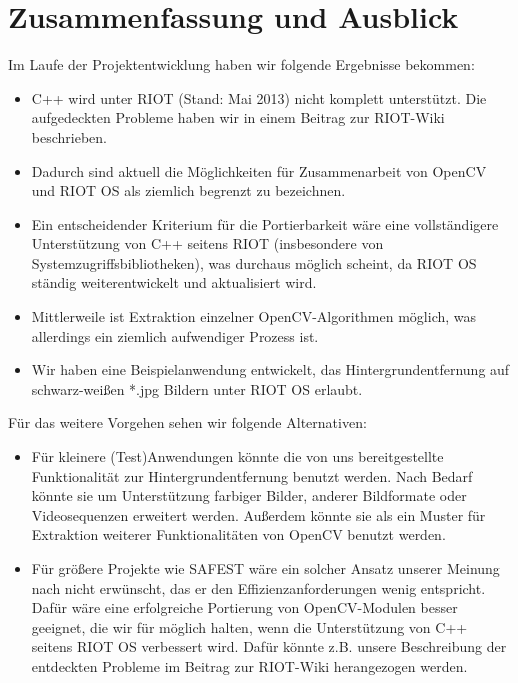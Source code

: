 \documentclass[10pt,a4paper]{article}
\begin{document}
\newpage
\section{Zusammenfassung und Ausblick}

Im Laufe der Projektentwicklung haben wir folgende Ergebnisse bekommen:

\begin{itemize}
\item C++ wird unter RIOT (Stand: Mai 2013) nicht komplett unterstützt. Die aufgedeckten Probleme haben wir in einem Beitrag zur RIOT-Wiki beschrieben. 
\item Dadurch sind aktuell die Möglichkeiten für Zusammenarbeit von OpenCV und RIOT OS als ziemlich begrenzt zu bezeichnen. 
\item Ein entscheidender Kriterium für die Portierbarkeit wäre eine vollständigere Unterstützung von C++ seitens RIOT (insbesondere von Systemzugriffsbibliotheken), was durchaus möglich scheint, da RIOT OS ständig weiterentwickelt und aktualisiert wird.
\item Mittlerweile ist Extraktion einzelner OpenCV-Algorithmen möglich, was allerdings ein ziemlich aufwendiger Prozess ist.
\item Wir haben eine Beispielanwendung entwickelt, das Hintergrundentfernung auf schwarz-weißen *.jpg Bildern unter RIOT OS erlaubt.
\end{itemize}

Für das weitere Vorgehen sehen wir folgende Alternativen: \\

\begin{itemize}
\item Für kleinere (Test)Anwendungen könnte die von uns bereitgestellte Funktionalität zur Hintergrundentfernung benutzt werden. Nach Bedarf könnte sie um Unterstützung farbiger Bilder, anderer Bildformate oder Videosequenzen erweitert werden. Außerdem könnte sie als ein Muster für Extraktion weiterer Funktionalitäten von OpenCV benutzt werden.
\item Für größere Projekte wie SAFEST wäre ein solcher Ansatz unserer Meinung nach nicht erwünscht, das er den Effizienzanforderungen wenig entspricht. Dafür wäre eine erfolgreiche Portierung von OpenCV-Modulen besser geeignet, die wir für möglich halten, wenn die Unterstützung von C++ seitens RIOT OS verbessert wird. Dafür könnte z.B. unsere Beschreibung der entdeckten Probleme im Beitrag zur RIOT-Wiki herangezogen werden. 
\end{itemize}
\end{document}
